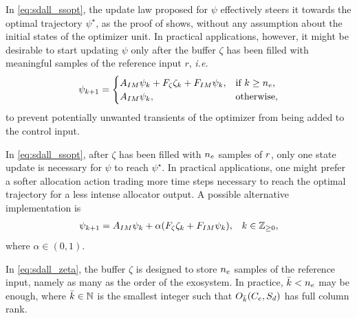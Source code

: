 \begin{remark}
  \label{rem:sdall_ximtrans}
  In \eqref{eq:sdall_ssopt}, the update law proposed for $\psi$ effectively steers it towards the optimal trajectory $\psi^{\star}$, as the proof of  shows, without any assumption about the initial states of the optimizer unit. In practical applications, however, it might be desirable to start updating $\psi$ only after the buffer $\zeta$ has been filled with meaningful samples of the reference input $r$, \emph{i.e.}
  \begin{equation}
    \label{eq:sdall_switchedxim}
    \psi_{k+1} = \begin{cases}
                    A_{IM}\psi_k + F_{\zeta}\zeta_k + F_{IM}\psi_k, & \text{if $k \geq {n_e}$},\\
                    A_{IM}\psi_k, & \text{otherwise},
                  \end{cases}
  \end{equation}
  to prevent potentially unwanted transients of the optimizer from being added to the control input.\closeremark
\end{remark}

\begin{remark}
  \label{rem:sdall_alp}
  In \eqref{eq:sdall_ssopt}, after $\zeta$ has been filled with ${n_e}$ samples of $r$, only one state update is necessary for $\psi$ to reach $\psi^{\star}$. In practical applications, one might prefer a softer allocation action trading more time steps necessary to reach the optimal trajectory for a less intense allocator output. A possible alternative implementation is
  \begin{align}
    \label{eq:sdall_ximalp}
    \psi_{k+1} &= A_{IM}\psi_k + \alpha(F_{\zeta}\zeta_k + F_{IM}\psi_k), & k\in\mathbb{Z}_{\geq 0},
  \end{align}
  where $\alpha\in(0,1)$.\closeremark
\end{remark}

\begin{remark}
  \label{rem:sdall_buf}
  In \eqref{eq:sdall_zeta}, the buffer $\zeta$ is designed to store ${n_e}$ samples of the reference input, namely as many as the order of the exosystem. In practice, $\bar{k}<{n_e}$ may be enough, where $\bar{k}\in\mathbb{N}$ is the smallest integer such that $O_{\bar{k}}(C_e,S_d)$ has full column rank.\closeremark
\end{remark}


